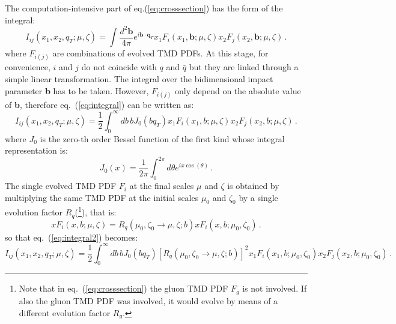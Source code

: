\documentclass[10pt,a4paper]{article}
\begin{document}
The computation-intensive part of eq.(\ref{eq:crosssection}) has the
form of the integral:
\begin{equation}\label{eq:integral}
I_{ij}(x_1,x_2,q_T;\mu,\zeta)=\int\frac{d^2\mathbf{b}}{4\pi} e^{i \mathbf{b}\cdot \mathbf{q}_T} x_1F_i(x_1,\mathbf{b};\mu,\zeta) x_2F_{j}(x_2,\mathbf{b};\mu,\zeta)\,.
\end{equation}
where $F_{i(j)}$ are combinations of evolved TMD PDFs. At this stage,
for convenience, $i$ and $j$ do not coincide with $q$ and $\bar{q}$
but they are linked through a simple linear transformation. The
integral over the bidimensional impact parameter \textbf{b} has to be
taken. However, $F_{i(j)}$ only depend on the absolute value of
\textbf{b}, therefore eq.~(\ref{eq:integral}) can be written as:
\begin{equation}\label{eq:integral2}
I_{ij}(x_1,x_2,q_T;\mu,\zeta)=\frac12\int_0^\infty db\,b J_0(bq_T)  x_1
F_i(x_1,b;\mu,\zeta) x_2 F_{j}(x_2,b;\mu,\zeta)\,.
\end{equation}
where $J_0$ is the zero-th order Bessel function of the first kind
whose integral representation is:
\begin{equation}
J_0(x) = \frac1{2\pi}\int_0^{2\pi} d\theta e^{ix\cos(\theta)}\,.
\end{equation}
The single evolved TMD PDF $F_i$ at the final scales $\mu$ and $\zeta$
is obtained by multiplying the same TMD PDF at the initial scales
$\mu_0$ and $\zeta_0$ by a single evolution factor
$R_q$(\footnote{Note that in eq.~(\ref{eq:crosssection}) the gluon TMD
  PDF $F_g$ is not involved. If also the gluon TMD PDF was involved,
  it would evolve by means of a different evolution factor $R_g$.}),
that is:
\begin{equation}
  xF_i(x,b;\mu,\zeta) = R_q(\mu_0,\zeta_0\rightarrow \mu,\zeta;b)
  xF_i(x,b;\mu_0,\zeta_0)\,.
\end{equation}
so that eq.~(\ref{eq:integral2}) becomes:
\begin{equation}\label{eq:integral3}
I_{ij}(x_1,x_2,q_T;\mu,\zeta)=\frac12\int_0^\infty db\,b J_0(bq_T)
\left[R_q(\mu_0,\zeta_0\rightarrow \mu,\zeta;b)\right]^2 x_1 F_i(x_1,b;\mu_0,\zeta_0) x_2F_{j}(x_2,b;\mu_0,\zeta_0)\,.
\end{equation}
\end{document}
